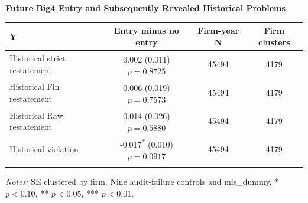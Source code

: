 \documentclass[10pt]{article}
\newcommand{\sym}[1]{\textsuperscript{#1}}
\begin{document}
\fontsize{10}{12}\selectfont\setlength{\parindent}{0pt}
\noindent\textbf{Future Big4 Entry and Subsequently Revealed Historical Problems}\par\medskip
\setlength{\tabcolsep}{3pt}\renewcommand{\arraystretch}{1.15}
\begin{tabular*}{\textwidth}{@{\extracolsep{\fill}}lccc@{}}
\toprule
Y & Entry minus no entry & Firm-year N & Firm clusters \\
\midrule
Historical strict restatement & \shortstack{0.002\sym{}\\(0.011)\\$p=0.8725$} & 45494 & 4179 \\ \addlinespace
Historical Fin restatement & \shortstack{0.006\sym{}\\(0.019)\\$p=0.7573$} & 45494 & 4179 \\ \addlinespace
Historical Raw restatement & \shortstack{0.014\sym{}\\(0.026)\\$p=0.5880$} & 45494 & 4179 \\ \addlinespace
Historical violation & \shortstack{-0.017\sym{*}\\(0.010)\\$p=0.0917$} & 45494 & 4179 \\ \addlinespace
\bottomrule
\end{tabular*}
\par\medskip\fontsize{9}{11}\selectfont\textit{Notes:} SE clustered by firm. Nine audit-failure controls and mis\_dummy. * $p<0.10$, ** $p<0.05$, *** $p<0.01$.
\end{document}
